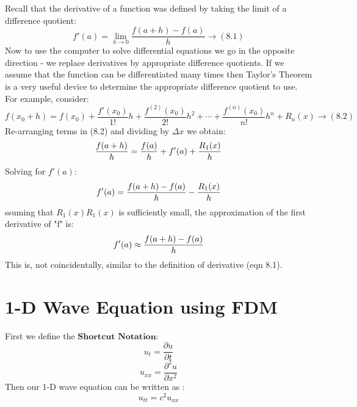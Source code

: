 \documentclass[oneside,hidelinks]{book}
\begin{document}
                Recall that the derivative of a function was defined by taking the limit of a difference quotient:
                        $$f'(a)=\lim _{h\to 0}{\frac {f(a+h)-f(a)}{h}}\rightarrow (8.1)$$
                        Now to use the computer to solve differential equations we go in the opposite direction - we replace derivatives
                        by appropriate difference quotients. If we assume that the function can be differentiated many times then Taylor's
                        Theorem is a very useful device to determine the appropriate difference quotient to use. For example, consider:
                $$ f(x_0 + h) = f(x_0) + \frac{f'(x_0)}{1!}h + \frac{f^{(2)}(x_0)}{2!}h^2 + \cdots + \frac{f^{(n)}(x_0)}{n!}h^n + R_n(x) \rightarrow (8.2)$$       
                Re-arranging terms in (8.2) and dividing by $\Delta x$ we obtain:
                $${f(a+h)\over h} = {f(a)\over h} + f'(a)+{R_1(x)\over h} $$
                Solving for $f'(a)$:
                $$f'(a) = {f(a+h)-f(a)\over h} - {R_1(x)\over h}$$
                ssuming that ${\displaystyle R_{1}(x)}R_1(x)$ is sufficiently small, the
                 approximation of the first derivative of "f" is:
                $$f'(a)\approx {f(a+h)-f(a)\over h}$$
                This is, not coincidentally, similar to the definition of derivative (eqn 8.1).

                \section{1-D Wave Equation using FDM}
                First we define the $\mathbf{\text{Shortcut Notation}}$:
                $$u_t=\frac{\partial u}{\partial t}$$
                $$u_{xx}=\frac{\partial^2 u}{\partial x^2}$$
                Then our 1-D wave equation can be written as :
                $$u_{tt}=c^2 u_{xx}$$
\end{document}
